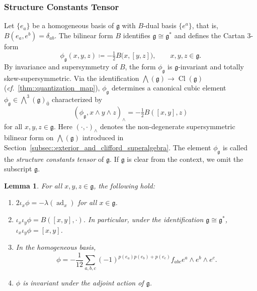 \documentclass[11pt]{amsart}
\newcommand{\ad}{\operatorname{ad}}
\def\Cl{{\operatorname{Cl}}}
\def\gg{{\mathfrak{g}}}
\theoremstyle{plain}
\newtheorem{lemma}[theorem]{Lemma}
\theoremstyle{remark}
\theoremstyle{definition}
\numberwithin{equation}{section}
\theoremstyle{remark}
\begin{document}
\subsubsection{Structure Constants Tensor}
Let $\{e_{a}\}$ be a homogeneous basis of $\gg$ with $B$-dual basis $\{e^{a}\}$, that is, $B(e_{a},e^{b})=\delta_{ab}$. The bilinear form $B$ identifies $\gg\cong \gg^{\ast}$ and defines the Cartan $3$-form
\begin{equation}
\phi_{\gg}(x,y,z)\coloneqq -\tfrac{1}{2}B\bigl(x,[y,z]\bigr),\qquad x,y,z\in\gg .
\end{equation}
By invariance and supersymmetry of $B$, the form $\phi_{\gg}$ is $\gg$-invariant and totally skew-supersymmetric. Via the identification $\bigwedge(\gg)\to \Cl(\gg)$ (\emph{cf.}~\ref{thm::quantization_map}), $\phi_{\gg}$ determines a canonical cubic element $\phi_{\gg}\in\bigwedge^{3}(\gg)_{\bar{0}}$ characterized by
\begin{equation}\label{eq::definition_phi}
(\phi_{\gg},x\wedge y\wedge z)_{\wedge}=-\tfrac{1}{2}B([x,y],z)
\end{equation}
for all $x,y,z\in\gg$. Here $(\cdot,\cdot)_{\wedge}$ denotes the non-degenerate supersymmetric bilinear form on $\bigwedge(\gg)$ introduced in Section~\ref{subsec::exterior_and_clifford_superalgebra}. The element $\phi_{\gg}$ is called the \emph{structure constants tensor} of $\gg$. If $\gg$ is clear from the context, we omit the subscript $\gg$.

\begin{lemma} \label{lemm::properties_phi_g_fd} For all $x,y,z\in \gg$, the following hold:
 \begin{enumerate}
 \item[a)] $2\iota_{x}\phi=-\lambda(\ad_{x})$ for all $x \in \gg$.
 \item[b)] $\iota_{x}\iota_{y}\phi=B([x,y], \cdot)$. In particular, under the identification $\gg \cong \gg^{\ast}$, $\iota_{x}\iota_{y}\phi=[x,y]$.
 \item[c)] In the homogeneous basis, 
 \[
 \phi=-\frac{1}{12} \sum_{a,b,c} (-1)^{p(e_{a})p(e_{b})+p(e_{c})}f_{abc}e^{a}\wedge e^{b} \wedge e^{c}.
 \]
 \item[d)] $\phi$ is invariant under the adjoint action of $\gg$.
 
 \end{enumerate}
\end{lemma}
\end{document}
